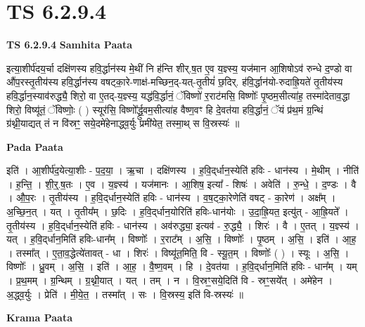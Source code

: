 \documentclass[17pt]{extarticle}
\begin{document}
\section{ TS 6.2.9.4 }

\textbf{TS 6.2.9.4 } \newline
\textbf{Samhita Paata} \newline

इत्या॒शीर्प॑दय॒र्चा दक्षि॑णस्य हवि॒र्द्धान॑स्य मे॒थीं नि ह॑न्ति शीर्.ष॒त ए॒व य॒ज्ञ्स्य॒ यज॑मान आ॒शिषोऽव॑ रुन्धे द॒ण्डो वा औ॑प॒रस्तृ॒तीय॑स्य हवि॒र्द्धान॑स्य वषट्का॒रे-णाक्ष॑-मच्छिन॒द्-यत्-तृ॒तीयं॑ छ॒दिर्. ह॑वि॒र्द्धान॑यो-रुदाह्रि॒यते॑ तृ॒तीय॑स्य हवि॒र्द्धान॒स्याव॑रुद्ध्यै॒ शिरो॒ वा ए॒तद्-य॒ज्ञ्स्य॒ यद्ध॑वि॒र्द्धानं॒ ॅविष्णो॑ र॒राट॑मसि॒ विष्णोः᳚ पृ॒ष्ठम॒सीत्या॑ह॒ तस्मा॑देताव॒द्धा शिरो॒ विष्यू॑तं॒ ॅविष्णोः॒ ( ) स्यूर॑सि॒ विष्णो᳚र्द्ध्रु॒वम॒सीत्या॑ह वैष्ण॒वꣳ हि दे॒वत॑या हवि॒र्द्धानं॒ ॅयं प्र॑थ॒मं ग्र॒न्थिं ग्र॑थ्नी॒याद्यत् तं न वि॑स्रꣳ॒॒ सये॒दमे॑हेनाद्ध्व॒र्युः प्रमी॑येत॒ तस्मा॒थ् स वि॒स्रस्यः॑ ॥ \newline

\textbf{Pada Paata} \newline

इति॑ । आ॒शीर्प॑द॒येत्या॒शीः - प॒द॒या॒ । ऋ॒चा । दक्षि॑णस्य । ह॒वि॒द्‌र्धान॒स्येति॑ हविः - धान॑स्य । मे॒थीम् । नीति॑ । ह॒न्ति॒ । शी॒र्॒.ष॒तः । ए॒व । य॒ज्ञ्स्य॑ । यज॑मानः । आ॒शिष॒ इत्या᳚ - शिषः॑ । अवेति॑ । रु॒न्धे॒ । द॒ण्डः । वै । औ॒प॒रः । तृ॒तीय॑स्य । ह॒वि॒द्‌र्धान॒स्येति॑ हविः - धान॑स्य । व॒ष॒ट्का॒रेणेति॑ वषट् - का॒रेण॑ । अक्ष᳚म् । अ॒च्छि॒न॒त् । यत् । तृ॒तीय᳚म् । छ॒दिः । ह॒वि॒द्‌र्धान॒योरिति॑ हविः-धान॑योः । उ॒दा॒ह्रि॒यत॒ इत्यु॑त् - आ॒ह्रि॒यते᳚ । तृ॒तीय॑स्य । ह॒वि॒द्‌र्धान॒स्येति॑ हविः - धान॑स्य । अव॑रुद्ध्या॒ इत्यव॑ - रु॒द्ध्यै॒ । शिरः॑ । वै । ए॒तत् । य॒ज्ञ्स्य॑ । यत् । ह॒वि॒द्‌र्धान॒मिति॑ हविः-धान᳚म् । विष्णोः᳚ । र॒राट᳚म् । अ॒सि॒ । विष्णोः᳚ । पृ॒ष्ठम् । अ॒सि॒ । इति॑ । आ॒ह॒ । तस्मा᳚त् । ए॒ता॒व॒द्धेत्ये॑तावत् - धा । शिरः॑ । विष्यू॑त॒मिति॒ वि - स्यू॒त॒म् । विष्णोः᳚ ( ) । स्यूः । अ॒सि॒ । विष्णोः᳚ । ध्रु॒वम् । अ॒सि॒ । इति॑ । आ॒ह॒ । वै॒ष्ण॒वम् । हि । दे॒वत॑या । ह॒वि॒द्‌र्धान॒मिति॑ हविः - धान᳚म् । यम् । प्र॒थ॒मम् । ग्र॒न्थिम् । ग्र॒थ्नी॒यात् । यत् । तम् । न । वि॒स्रꣳ॒॒सये॒दिति॑ वि - स्रꣳ॒॒सये᳚त् । अमे॑हेन । अ॒द्ध्व॒र्युः । प्रेति॑ । मी॒ये॒त॒ । तस्मा᳚त् । सः । वि॒स्रस्य॒ इति॑ वि-स्रस्यः॑ ॥  \newline


\textbf{Krama Paata} \newline
\end{document}
